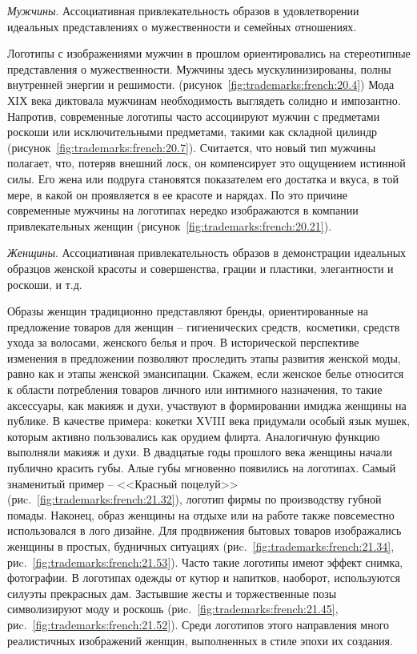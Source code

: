    \emph{Мужчины}. Ассоциативная привлекательность образов в удовлетворении
      идеальных представлениях о мужественности и семейных отношениях.

      Логотипы с изображениями мужчин в прошлом ориентировались на стереотипные
      представления о мужественности. Мужчины здесь мускулинизированы, полны
      внутренней энергии и решимости. (рисунок~\ref{fig:trademarks:french:20.4})
      Мода ХIХ века диктовала мужчинам необходимость выглядеть солидно и
      импозантно. Напротив, современные логотипы часто ассоциируют мужчин с
      предметами роскоши или исключительными предметами, такими как складной
      цилиндр (рисунок~\ref{fig:trademarks:french:20.7}). Считается, что новый тип
      мужчины полагает, что, потеряв внешний лоск, он компенсирует это ощущением
      истинной силы. Его жена или подруга становятся показателем его достатка и
      вкуса, в той мере, в какой он проявляется в ее красоте и нарядах. По это
      причине современные мужчины на логотипах нередко изображаются в компании
      привлекательных женщин (рисунок~\ref{fig:trademarks:french:20.21}).

  \emph{Женщины}. Ассоциативная привлекательность образов в демонстрации
      идеальных образцов женской красоты и совершенства, грации и пластики,
      элегантности и роскоши, и т.д.

      Образы женщин традиционно представляют бренды, ориентированные
      на предложение товаров для женщин -- гигиенических средств,~косметики, средств
      ухода за волосами, женского белья и проч. В исторической перспективе изменения в
      предложении позволяют проследить этапы развития женской моды, равно как и этапы
      женской эмансипации. Скажем, если женское белье относится к области потребления
      товаров личного или интимного назначения, то такие аксессуары, как макияж и
      духи, участвуют в формировании имиджа женщины на публике. В качестве примера:
      кокетки ХVIII века придумали особый язык мушек, которым активно пользовались как
      орудием флирта. Аналогичную функцию выполняли макияж и духи. В двадцатые годы
      прошлого века женщины начали публично красить губы. Алые губы мгновенно
      появились на логотипах. Самый знаменитый пример -- <<Красный поцелуй>> (риc.~\ref{fig:trademarks:french:21.32}),
      логотип фирмы по производству губной помады. Наконец, образ женщины на отдыхе
      или на работе также повсеместно использовался в лого дизайне. Для продвижения
      бытовых товаров изображались женщины в простых, будничных ситуациях (риc.~\ref{fig:trademarks:french:21.34},
      риc.~\ref{fig:trademarks:french:21.53}). Часто такие логотипы имеют эффект снимка, фотографии. В логотипах одежды
      от кутюр и напитков, наоборот, используются силуэты прекрасных дам. Застывшие
      жесты и торжественные позы символизируют моду и роскошь
      (риc.~\ref{fig:trademarks:french:21.45}, риc.~\ref{fig:trademarks:french:21.52}). Среди
      логотипов этого направления много реалистичных изображений женщин, выполненных в
      стиле эпохи их создания.


